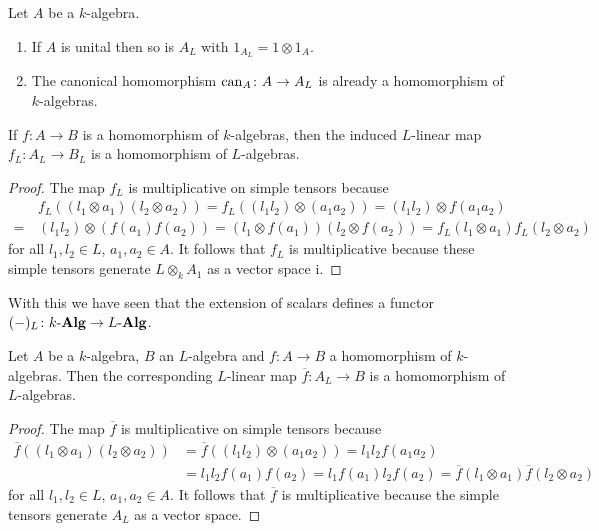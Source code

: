 \begin{remark}
  Let $A$ be a $k$-algebra.
  \begin{enumerate}
    \item
    If $A$ is unital then so is $A_L$ with $1_{A_L} = 1 \otimes 1_A$.
    \item
    The canonical homomorphism $\operatorname{can}_A \colon A \to A_L$ is already a homomorphism of $k$-algebras.
  \end{enumerate}
\end{remark}


\begin{lemma}
  If $f \colon A \to B$ is a homomorphism of $k$-algebras, then the induced $L$-linear map $f_L \colon A_L \to B_L$ is a homomorphism of $L$-algebras.
\end{lemma}
\begin{proof}
  The map $f_L$ is multiplicative on simple tensors because
  \begin{align*}
     &\,  f_L((l_1 \otimes a_1)(l_2 \otimes a_2))
    =     f_L((l_1 l_2) \otimes (a_1 a_2))
    =     (l_1 l_2) \otimes f(a_1 a_2) \\
    =&\,  (l_1 l_2) \otimes (f(a_1)f(a_2))
    =     (l_1 \otimes f(a_1)) (l_2 \otimes f(a_2))
    =     f_L(l_1 \otimes a_1) f_L(l_2 \otimes a_2)
  \end{align*}
  for all $l_1, l_2 \in L$, $a_1, a_2 \in A$.
  It follows that $f_L$ is multiplicative because these simple tensors generate $L \otimes_k A_1$ as a vector space i.
\end{proof}
  
  
\begin{remark}
  With this we have seen that the extension of scalars defines a functor $(-)_L \colon k\text{-}\mathbf{Alg} \to L\text{-}\mathbf{Alg}$.
\end{remark}


\begin{lemma}
  \label{lemma: universal property of extension of scalars for algebras}
  Let $A$ be a $k$-algebra, $B$ an $L$-algebra and $f \colon A \to B$ a homomorphism of $k$-algebras.
  Then the corresponding $L$-linear map $\overline{f} \colon A_L \to B$ is a homomorphism of $L$-algebras.
  \begin{proof}
  The map $\overline{f}$ is multiplicative on simple tensors because
    \begin{align*}
          \overline{f}((l_1 \otimes a_1)(l_2 \otimes a_2))
      &=  \overline{f}((l_1 l_2) \otimes (a_1 a_2))
       =  l_1 l_2 f(a_1 a_2)    \\
      &=  l_1 l_2 f(a_1) f(a_2)
       =  l_1 f(a_1) l_2 f(a_2)
       =  \overline{f}(l_1 \otimes a_1) \overline{f}(l_2 \otimes a_2)
    \end{align*}
    for all $l_1, l_2 \in L$, $a_1, a_2 \in A$.
    It follows that $\overline{f}$ is multiplicative because the simple tensors generate $A_L$ as a vector space.
  \end{proof}
\end{lemma}


